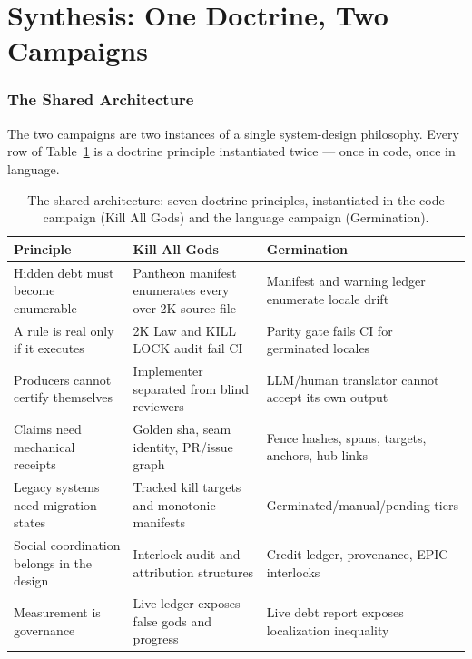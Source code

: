 \documentclass[11pt]{article}
\theoremstyle{definition}
\theoremstyle{plain}
\theoremstyle{remark}
\begin{document}
\part{Synthesis: One Doctrine, Two Campaigns}
\label{part:synthesis}

\section{The Shared Architecture}
\label{sec:shared}

The two campaigns are two instances of a single system-design philosophy.
Every row of Table~\ref{tab:shared} is a doctrine principle instantiated
twice --- once in code, once in language.

\begin{table}[H]
\centering
\caption{The shared architecture: seven doctrine principles, instantiated
in the code campaign (Kill All Gods) and the language campaign
(Germination).}
\label{tab:shared}
\begin{tabular}{@{}p{}p{}p{}@{}}
\toprule
Principle & Kill All Gods & Germination \\
\midrule
Hidden debt must become enumerable & Pantheon manifest enumerates every over-2K source file & Manifest and warning ledger enumerate locale drift \\
A rule is real only if it executes & 2K Law and KILL LOCK audit fail CI & Parity gate fails CI for germinated locales \\
Producers cannot certify themselves & Implementer separated from blind reviewers & LLM/human translator cannot accept its own output \\
Claims need mechanical receipts & Golden sha, seam identity, PR/issue graph & Fence hashes, spans, targets, anchors, hub links \\
Legacy systems need migration states & Tracked kill targets and monotonic manifests & Germinated/manual/pending tiers \\
Social coordination belongs in the design & Interlock audit and attribution structures & Credit ledger, provenance, EPIC interlocks \\
Measurement is governance & Live ledger exposes false gods and progress & Live debt report exposes localization inequality \\
\bottomrule
\end{tabular}
\end{table}
\end{document}
